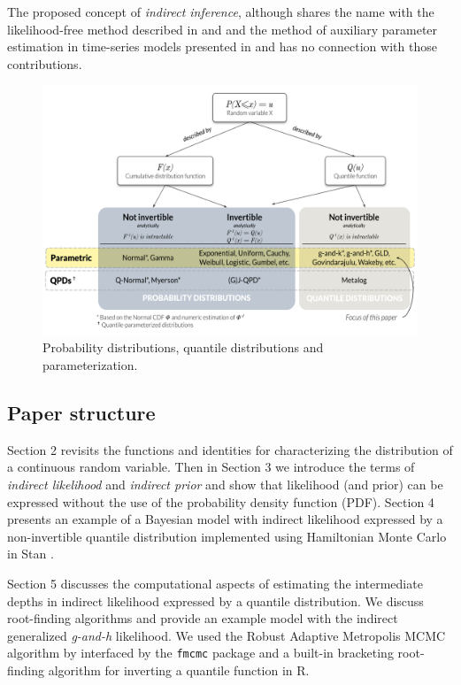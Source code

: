 \documentclass[ba]{imsart}
\numberwithin{equation}{section}
\theoremstyle{plain}
\begin{document}
The proposed concept of \emph{indirect inference}, although shares the name with the likelihood-free method described in \citet{heggland2004EstimatingFunctionsIndirect} and \citet{drovandi2011LikelihoodfreeBayesianEstimation} and the method of auxiliary parameter estimation in time-series models presented in \citet{smithjr.1993EstimatingNonlinearTimeseries} and \citet{gourieroux1993IndirectInference} has no connection with those contributions.

\begin{figure}

{\centering \includegraphics[width=4.8in]{img/QDs} 

}

\caption{Probability distributions, quantile distributions and parameterization.}\label{fig:qdist-chart}
\end{figure}

\hypertarget{paper-structure}{%
\subsection{Paper structure}\label{paper-structure}}

Section 2 revisits the functions and identities for characterizing the distribution of a continuous random variable. Then in Section 3 we introduce the terms of \emph{indirect likelihood} and \emph{indirect prior} and show that likelihood (and prior) can be expressed without the use of the probability density function (PDF). Section 4 presents an example of a Bayesian model with indirect likelihood expressed by a non-invertible quantile distribution implemented using Hamiltonian Monte Carlo in Stan \citep{standevelopmentteam2021RStanInterfaceStan}.

Section 5 discusses the computational aspects of estimating the intermediate depths in indirect likelihood expressed by a quantile distribution. We discuss root-finding algorithms and provide an example model with the indirect generalized \emph{g-and-h} \citep{haynes1997RobustnessRankingSelection} likelihood. We used the Robust Adaptive Metropolis MCMC algorithm by \citet{vihola2012RobustAdaptiveMetropolis} interfaced by the \texttt{fmcmc} package \citep{vegayon2019FmcmcFriendlyMCMC} and a built-in bracketing root-finding algorithm for inverting a quantile function in R\citep{rcoreteam2021LanguageEnvironmentStatistical}.
\end{document}
